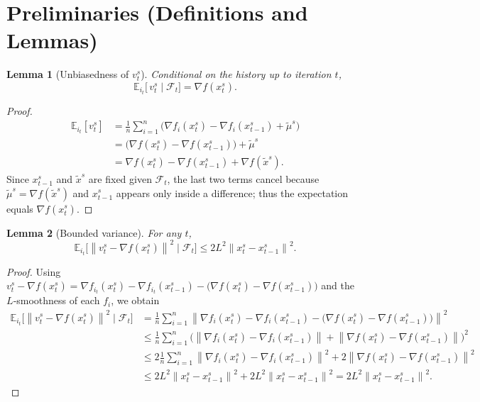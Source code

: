 \documentclass[11pt]{article}
\newtheorem{lemma}{Lemma}
\newcommand{\E}{\mathbb{E}}
\newcommand{\norm}[1]{\left\|#1\right\|}
\newcommand{\grad}{\nabla}
\begin{document}
\section*{Preliminaries (Definitions and Lemmas)}
\begin{lemma}[Unbiasedness of $v_{t}^{s}$]\label{lem:unbiased}
Conditional on the history up to iteration $t$, 
\[
\E_{i_t}\!\bigl[\,v_{t}^{s}\mid \mathcal{F}_{t}\bigr]=\grad f(x_{t}^{s}).
\]
\end{lemma}
\begin{proof}
\[
\begin{aligned}
\E_{i_t}[v_{t}^{s}]
&= \frac1n\sum_{i=1}^{n}\bigl(\grad f_i(x_{t}^{s})-\grad f_i(x_{t-1}^{s})+\tilde{\mu}^{s}\bigr)\\
&= \bigl(\grad f(x_{t}^{s})-\grad f(x_{t-1}^{s})\bigr)+\tilde{\mu}^{s}\\
&= \grad f(x_{t}^{s})-\grad f(x_{t-1}^{s})+\grad f(\tilde{x}^{s}) .
\end{aligned}
\]
Since $x_{t-1}^{s}$ and $\tilde{x}^{s}$ are fixed given $\mathcal{F}_{t}$, the last two terms cancel because $\tilde{\mu}^{s}=\grad f(\tilde{x}^{s})$ and $x_{t-1}^{s}$ appears only inside a difference; thus the expectation equals $\grad f(x_{t}^{s})$.
\end{proof}

\begin{lemma}[Bounded variance]\label{lem:var}
For any $t$,
\[
\E_{i_t}\!\bigl[\norm{v_{t}^{s}-\grad f(x_{t}^{s})}^{2}\mid\mathcal{F}_{t}\bigr]
\le 2L^{2}\norm{x_{t}^{s}-x_{t-1}^{s}}^{2}.
\tag{4}
\]
\end{lemma}
\begin{proof}
Using $v_{t}^{s}-\grad f(x_{t}^{s})=\grad f_{i_t}(x_{t}^{s})-\grad f_{i_t}(x_{t-1}^{s})-\bigl(\grad f(x_{t}^{s})-\grad f(x_{t-1}^{s})\bigr)$ and the $L$‑smoothness of each $f_i$, we obtain
\[
\begin{aligned}
\E_{i_t}\!\bigl[\norm{v_{t}^{s}-\grad f(x_{t}^{s})}^{2}\mid\mathcal{F}_{t}\bigr]
&= \frac1n\sum_{i=1}^{n}\norm{\grad f_i(x_{t}^{s})-\grad f_i(x_{t-1}^{s})-\bigl(\grad f(x_{t}^{s})-\grad f(x_{t-1}^{s})\bigr)}^{2}\\
&\le \frac1n\sum_{i=1}^{n}\bigl(\norm{\grad f_i(x_{t}^{s})-\grad f_i(x_{t-1}^{s})}+\norm{\grad f(x_{t}^{s})-\grad f(x_{t-1}^{s})}\bigr)^{2}\\
&\le 2\frac1n\sum_{i=1}^{n}\norm{\grad f_i(x_{t}^{s})-\grad f_i(x_{t-1}^{s})}^{2}+2\norm{\grad f(x_{t}^{s})-\grad f(x_{t-1}^{s})}^{2}\\
&\le 2L^{2}\norm{x_{t}^{s}-x_{t-1}^{s}}^{2}+2L^{2}\norm{x_{t}^{s}-x_{t-1}^{s}}^{2}=2L^{2}\norm{x_{t}^{s}-x_{t-1}^{s}}^{2}.
\end{aligned}
\]
\end{proof}
\end{document}
